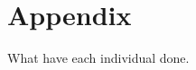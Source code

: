 \documentclass[11pt]{article}
\begin{document}
\section*{Appendix}
What have each individual done.






\end{document}
